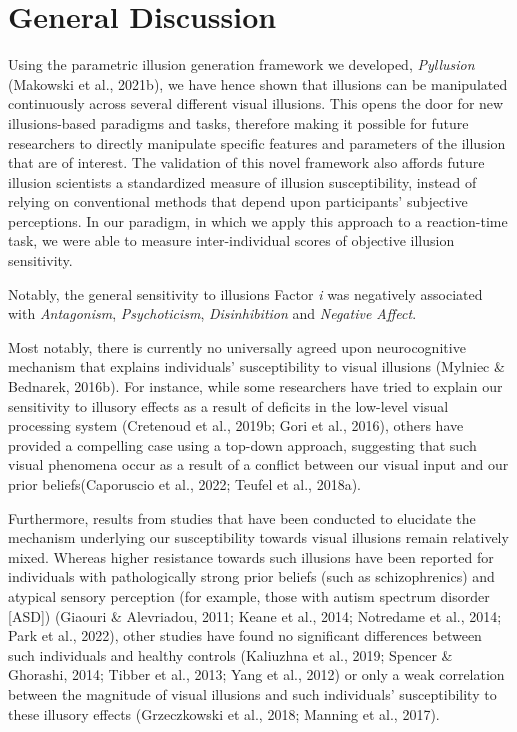 \documentclass[
  man,floatsintext]{apa6}
\begin{document}
\hypertarget{general-discussion}{%
\section{General Discussion}\label{general-discussion}}

Using the parametric illusion generation framework we developed, \emph{Pyllusion} (Makowski et al., 2021b), we have hence shown that illusions can be manipulated continuously across several different visual illusions. This opens the door for new illusions-based paradigms and tasks, therefore making it possible for future researchers to directly manipulate specific features and parameters of the illusion that are of interest. The validation of this novel framework also affords future illusion scientists a standardized measure of illusion susceptibility, instead of relying on conventional methods that depend upon participants' subjective perceptions. In our paradigm, in which we apply this approach to a reaction-time task, we were able to measure inter-individual scores of objective illusion sensitivity.

Notably, the general sensitivity to illusions Factor \emph{i} was negatively associated with \emph{Antagonism}, \emph{Psychoticism}, \emph{Disinhibition} and \emph{Negative Affect}.

Most notably, there is currently no universally agreed upon neurocognitive mechanism that explains individuals' susceptibility to visual illusions (Mylniec \& Bednarek, 2016b). For instance, while some researchers have tried to explain our sensitivity to illusory effects as a result of deficits in the low-level visual processing system (Cretenoud et al., 2019b; Gori et al., 2016), others have provided a compelling case using a top-down approach, suggesting that such visual phenomena occur as a result of a conflict between our visual input and our prior beliefs(Caporuscio et al., 2022; Teufel et al., 2018a).

Furthermore, results from studies that have been conducted to elucidate the mechanism underlying our susceptibility towards visual illusions remain relatively mixed. Whereas higher resistance towards such illusions have been reported for individuals with pathologically strong prior beliefs (such as schizophrenics) and atypical sensory perception (for example, those with autism spectrum disorder {[}ASD{]}) (Giaouri \& Alevriadou, 2011; Keane et al., 2014; Notredame et al., 2014; Park et al., 2022), other studies have found no significant differences between such individuals and healthy controls (Kaliuzhna et al., 2019; Spencer \& Ghorashi, 2014; Tibber et al., 2013; Yang et al., 2012) or only a weak correlation between the magnitude of visual illusions and such individuals' susceptibility to these illusory effects (Grzeczkowski et al., 2018; Manning et al., 2017).
\end{document}
